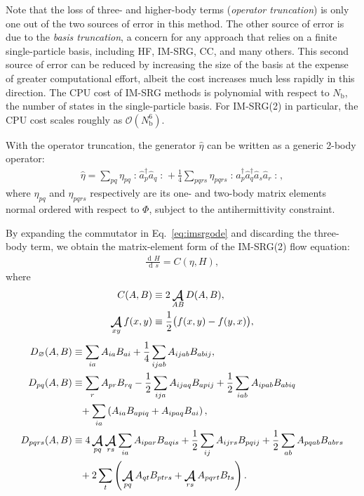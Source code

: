 \documentclass[aip, jcp, 12pt]{revtex4-1}
\newcommand{\D}{\operatorname{d\!}}
\newcommand{\normord}[1]{\mathopen: #1 \mathclose:}
\newcommand{\antisymm}{\mathop{\scalerel*{\mathcal{A}}{\textstyle\sum}}\displaylimits}
\begin{document}
Note that the loss of three- and higher-body terms (\textit{operator truncation}) is only one out of the two sources of error in this method.  The other source of error is due to the \textit{basis truncation}, a concern for any approach that relies on a finite single-particle basis, including HF, IM-SRG, CC, and many others.  This second source of error can be reduced by increasing the size of the basis at the expense of greater computational effort, albeit the cost increases much less rapidly in this direction.  The CPU cost of IM-SRG methods is polynomial with respect to $N_{\mathrm{b}}$, the number of states in the single-particle basis.  For IM-SRG(2) in particular, the CPU cost scales roughly as $\mathcal{O}(N_{\mathrm{b}}^6)$.

With the operator truncation, the generator $\hat{\eta}$ can be written as a generic 2-body operator:
\begin{align*}
\hat{\eta} = \sum_{p q} \eta_{p q} \normord{\hat a_p^\dagger \hat a_q} +
\frac{1}{4} \sum_{p q r s}\eta_{p q r s} \normord{\hat a_p^\dagger \hat a_q^\dagger \hat a_s \hat a_r},
\end{align*}
where $\eta_{p q}$ and $ \eta_{p q r s}$ respectively are its one- and two-body matrix elements normal ordered with respect to $\Phi$, subject to the antihermittivity constraint.

By expanding the commutator in Eq.\ \eqref{eq:imsrgode} and discarding the three-body term, we obtain the matrix-element form of the IM-SRG(2) flow equation:
\begin{align}
    \frac{\D H}{\D s} = C(\eta, H), \label{eq:flowmxe}
\end{align}
where
\begin{align}
  C(A, B) &\equiv 2 \antisymm_{A B} D(A, B), \label{eq:commutmxe} \\
  \antisymm_{x y} f(x, y) &\equiv \frac{1}{2} \bigl(f(x, y) - f(y, x)\bigr),
\end{align}
\begin{align}
  D_\varnothing(A, B)
  &\equiv
    \sum_{i a} A_{i a} B_{a i}
    + \frac{1}{4} \sum_{i j a b} A_{i j a b} B_{a b i j},
    \label{eq:flow0} \\
  D_{p q}(A, B)
  &\equiv
    \sum_r A_{p r} B_{r q}
    - \frac{1}{2} \sum_{i j a} A_{i j a q} B_{a p i j}
    + \frac{1}{2} \sum_{i a b} A_{i p a b} B_{a b i q}
    \notag \\
  &\hphantom{=}
    + \sum_{i a} \left(
    A_{i a} B_{a p i q}
    + A_{i p a q} B_{a i}
    \right),
    \label{eq:flow1} \\
  D_{p q r s}(A, B)
  &\equiv
    4 \antisymm_{p q} \antisymm_{r s} \sum_{i a} A_{i p a r} B_{a q i s}
    + \frac{1}{2} \sum_{i j} A_{i j r s} B_{p q i j}
    + \frac{1}{2} \sum_{a b} A_{p q a b} B_{a b r s}
    \notag \\
  &\hphantom{=}
    + 2 \sum_t \left(
    \antisymm_{p q} A_{q t} B_{p t r s}
    + \antisymm_{r s} A_{p q r t} B_{t s}
    \right).
    \label{eq:flow2}
\end{align}
\end{document}
